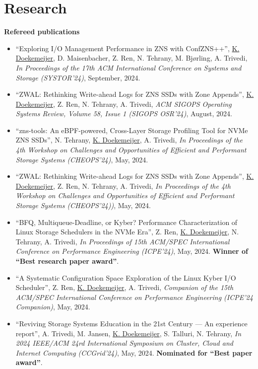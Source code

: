 \documentclass[letterpaper,11pt]{article}
\begin{document}
\section{Research}

\textbf{Refereed publications}
\begin{itemize}[label={}]
\item
  ``Exploring I/O Management Performance in ZNS with ConfZNS++'', 
  \underline{K. Doekemeijer}, D. Maisenbacher, Z. Ren, N. Tehrany, M. Bjørling, A. Trivedi,
  \textit{In Proceedings of the 17th ACM International Conference on Systems and Storage (SYSTOR'24)}, 
  September, 2024.

\item
  ``ZWAL: Rethinking Write-ahead Logs for ZNS SSDs with Zone Appends'', 
  \underline{K. Doekemeijer}, Z. Ren, N. Tehrany, A. Trivedi,
  \textit{ACM SIGOPS Operating Systems Review, Volume 58, Issue 1 (SIGOPS OSR'24)}, 
  August, 2024.

\item
  ``zns-tools: An eBPF-powered, Cross-Layer Storage Profiling Tool for NVMe ZNS SSDs'', 
  N. Tehrany, \underline{K. Doekemeijer}, A. Trivedi,
  \textit{In Proceedings of the 4th Workshop on Challenges and Opportunities of Efficient and Performant Storage Systems (CHEOPS'24)},
  May, 2024.

\item
  ``ZWAL: Rethinking Write-ahead Logs for ZNS SSDs with Zone Appends'', 
  \underline{K. Doekemeijer}, Z. Ren, N. Tehrany, A. Trivedi,
  \textit{In Proceedings of the 4th Workshop on Challenges and Opportunities of Efficient and Performant Storage Systems (CHEOPS'24))}, 
  May, 2024.

\item
  ``BFQ, Multiqueue-Deadline, or Kyber? Performance Characterization of Linux Storage Schedulers in the NVMe Era'', 
  Z. Ren, \underline{K. Doekemeijer}, N. Tehrany, A. Trivedi,
  \textit{In Proceedings of 15th ACM/SPEC International Conference on Performance Engineering (ICPE'24)}, 
  May, 2024. 
  \textbf{Winner of ``Best research paper award''}.

\item
  ``A Systematic Configuration Space Exploration of the Linux Kyber I/O Scheduler'', 
  Z. Ren, \underline{K. Doekemeijer}, A. Trivedi,
  \textit{Companion of the 15th ACM/SPEC International Conference on Performance Engineering (ICPE’24 Companion)}, 
  May, 2024.

\item
  ``Reviving Storage Systems Education in the 21st Century — An experience report'', 
  A. Trivedi, M. Jansen, \underline{K. Doekemeijer}, S. Talluri, N. Tehrany,
  \textit{In 2024 IEEE/ACM 24rd International Symposium on Cluster, Cloud and Internet Computing (CCGrid'24)}, 
  May, 2024. 
  \textbf{Nominated for ``Best paper award''}.


\end{itemize}
\end{document}
